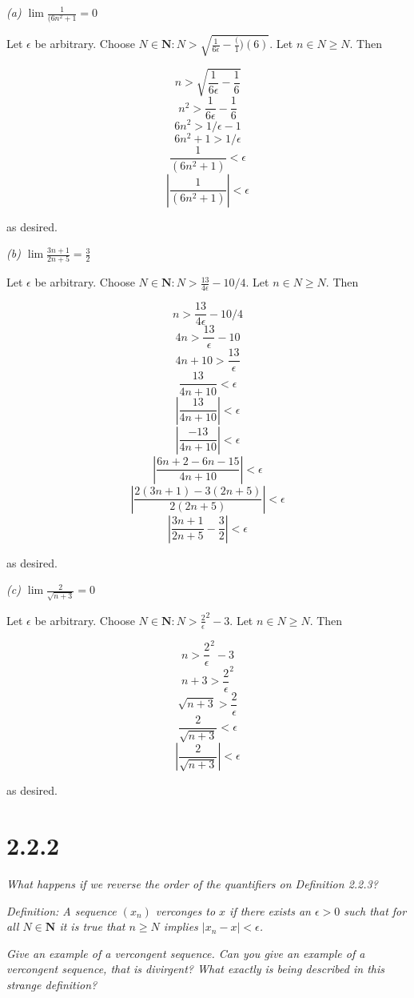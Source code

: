 \documentclass[11pt,oneside,titlepage]{article}
\begin{document}
\textit{(a) $\lim\frac{1}{(6 n ^ 2 + 1} = 0$}

Let $\epsilon$ be arbitrary. Choose
$N \in \textbf{N}: N > \sqrt{\frac{1}{6 \epsilon} - \frac(1)(6)}$. Let $n \in N \geq N$. Then

$$n > \sqrt{\frac{1}{6 \epsilon} - \frac{1}{6}}$$
$$n ^ 2  > \frac{1}{6 \epsilon} - \frac{1}{6}$$
$$6 n ^ 2  > 1/\epsilon - 1$$
$$6 n ^ 2 + 1 > 1/\epsilon$$
$$\frac{1}{(6 n ^ 2 + 1)} < \epsilon$$
$$|\frac{1}{(6 n ^ 2 + 1)}| < \epsilon$$

as desired.

\textit{(b) $\lim\frac{3n + 1}{2n + 5} = \frac{3}{2}$}

Let $\epsilon$ be arbitrary. Choose
$N \in \textbf{N}: N > \frac{13}{4 \epsilon} - 10/4$. Let $n \in N \geq N$. Then

$$ n > \frac{13}{4 \epsilon} - 10/4$$
$$ 4n > \frac{13}{\epsilon} - 10$$
$$ 4n + 10 > \frac{13}{\epsilon} $$
$$ \frac{13}{4n + 10} < \epsilon $$
$$ |\frac{13}{4n + 10}| < \epsilon $$
$$ |\frac{-13}{4n + 10}| < \epsilon $$
$$ |\frac{6n + 2 - 6n - 15}{4n + 10}| < \epsilon $$
$$ |\frac{2(3n + 1) - 3(2n + 5)}{2(2n + 5)}| < \epsilon $$
$$ |\frac{3n + 1}{2n + 5} - \frac{3}{2}| < \epsilon $$

as desired.

\textit{(c) $\lim\frac{2}{\sqrt{n + 3}} = 0$}

Let $\epsilon$ be arbitrary. Choose
$N \in \textbf{N}: N > {\frac{2}{\epsilon}}^2 - 3$. Let $n \in N \geq N$. Then

$$n> {\frac{2}{\epsilon}}^2 - 3$$
$$n + 3 > {\frac{2}{\epsilon}}^2$$
$$\sqrt{n + 3} > \frac{2}{\epsilon}$$
$$\frac{2}{\sqrt{n + 3}} < \epsilon$$
$$|\frac{2}{\sqrt{n + 3}}| < \epsilon$$

as desired.

\section*{2.2.2}
\textit{What happens if we reverse the order of the quantifiers on Definition 2.2.3?}

\textit{Definition: A sequence $(x_n)$ verconges to $x$ if there exists an $\epsilon > 0$
  such that for all $N \in \textbf{N}$ it is true that $n \geq N$ implies $|x_n - x| <
  \epsilon$.}

\textit{Give an example of a vercongent sequence. Can you give an example of a vercongent
  sequence, that is divirgent? What exactly is being described in this strange definition?}
\end{document}
